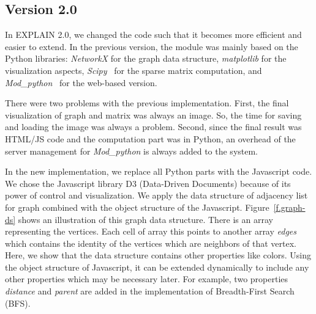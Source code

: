 \documentclass[12pt, twoside,a4paper,toc=bibliography]{scrbook}
\begin{document}
\subsection{Version 2.0}
\label{s.impl.explain2}
In EXPLAIN 2.0, we changed the code such that it becomes more efficient and easier to extend.
In the previous version, the module was mainly based on the Python libraries:
\textit{NetworkX} \cite{networkx2008} for the graph data structure,
\textit{matplotlib} \cite{matplotlib2007} for the visualization aspects,
\textit{Scipy}~\cite{scipy2001} for the sparse matrix computation, and
\textit{Mod\_python}~\cite{modpython2013} for the web-based version.

There were two problems with the previous implementation. First, the final visualization
of graph and matrix was always an image.
So, the time for saving and loading the image was always a problem.
Second, since the final result was HTML/JS code and the computation part was in Python,
an overhead of the server management for \textit{Mod\_python} is always added to the system.

In the new implementation, we replace all Python parts with the Javascript code.
We chose the Javascript library D3 (Data-Driven Documents)
because of its power of control and visualization.
We apply the data structure of adjacency list for graph
combined with the object structure of the Javascript. 
Figure~\ref{f.graph-ds} shows an illustration
of this graph data structure. There is an array representing the vertices.
Each cell of array this points to another array \textit{edges} which contains
the identity of the vertices which are neighbors of that vertex.
Here, we show that the data structure contains other properties like colors.
Using the object structure of Javascript,
it can be extended dynamically to include any other properties which may be necessary later. For example, two properties \textit{distance} and \textit{parent} are added
in the implementation of Breadth-First Search (BFS).
\end{document}
